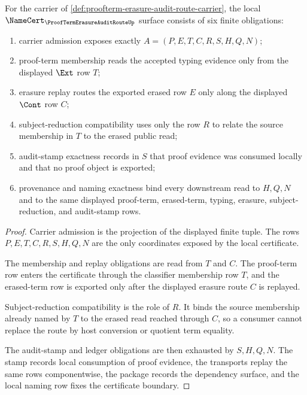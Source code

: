 \begin{theorem}
\label{thm:proofterm-erasure-audit-route-namecert-obligations}
For the carrier of \autoref{def:proofterm-erasure-audit-route-carrier}, the local $\NameCert_{\ProofTermErasureAuditRouteUp}$ surface consists of six finite obligations:
\begin{enumerate}
\item carrier admission exposes exactly $A=(P,E,T,C,R,S,H,Q,N)$;
\item proof-term membership reads the accepted typing evidence only from the displayed $\Ext$ row $T$;
\item erasure replay routes the exported erased row $E$ only along the displayed $\Cont$ row $C$;
\item subject-reduction compatibility uses only the row $R$ to relate the source membership in $T$ to the erased public read;
\item audit-stamp exactness records in $S$ that proof evidence was consumed locally and that no proof object is exported;
\item provenance and naming exactness bind every downstream read to $H,Q,N$ and to the same displayed proof-term, erased-term, typing, erasure, subject-reduction, and audit-stamp rows.
\end{enumerate}
\end{theorem}
\begin{proof}
Carrier admission is the projection of the displayed finite tuple. The rows $P,E,T,C,R,S,H,Q,N$ are the only coordinates exposed by the local certificate.

The membership and replay obligations are read from $T$ and $C$. The proof-term row enters the certificate through the classifier membership row $T$, and the erased-term row is exported only after the displayed erasure route $C$ is replayed.

Subject-reduction compatibility is the role of $R$. It binds the source membership already named by $T$ to the erased read reached through $C$, so a consumer cannot replace the route by host conversion or quotient term equality.

The audit-stamp and ledger obligations are then exhausted by $S,H,Q,N$. The stamp records local consumption of proof evidence, the transports replay the same rows componentwise, the package records the dependency surface, and the local naming row fixes the certificate boundary.
\end{proof}

